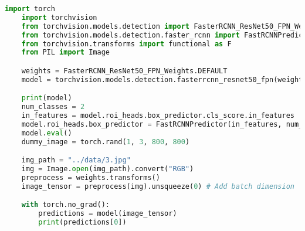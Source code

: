 \begin{lstlisting}[caption={fastrcnn.py}, label={lst:code-example}, captionpos=t, language=python]
    import torch
    import torchvision
    from torchvision.models.detection import FasterRCNN_ResNet50_FPN_Weights
    from torchvision.models.detection.faster_rcnn import FastRCNNPredictor
    from torchvision.transforms import functional as F
    from PIL import Image

    weights = FasterRCNN_ResNet50_FPN_Weights.DEFAULT 
    model = torchvision.models.detection.fasterrcnn_resnet50_fpn(weights=weights)

    print(model)
    num_classes = 2 
    in_features = model.roi_heads.box_predictor.cls_score.in_features
    model.roi_heads.box_predictor = FastRCNNPredictor(in_features, num_classes)
    model.eval()
    dummy_image = torch.rand(1, 3, 800, 800)

    img_path = "../data/3.jpg"
    img = Image.open(img_path).convert("RGB")
    preprocess = weights.transforms()
    image_tensor = preprocess(img).unsqueeze(0) # Add batch dimension

    with torch.no_grad(): 
        predictions = model(image_tensor) 
        print(predictions[0])
\end{lstlisting}